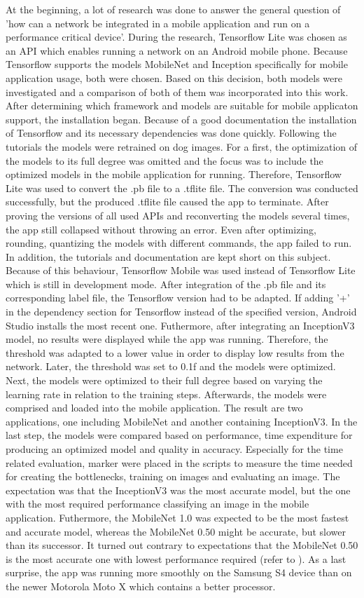 At the beginning, a lot of research was done to answer the general question of 'how can a network be integrated in a mobile application and run on a performance critical device'. During the research, Tensorflow Lite was chosen as an API which enables running a network on an Android mobile phone. Because Tensorflow supports the models MobileNet and Inception specifically for mobile application usage, both were chosen. Based on this decision, both models were investigated and a comparison of both of them was incorporated into this work. After determining which framework and models are suitable for mobile applicaton support, the installation began. Because of a good documentation the installation of Tensorflow and its necessary dependencies was done quickly. Following the tutorials the models were retrained on dog images. For a first, the optimization of the models to its full degree was omitted and the focus was to include the optimized models in the mobile application for running. Therefore, Tensorflow Lite was used to convert the .pb file to a .tflite file. The conversion was conducted successfully, but the produced .tflite file caused the app to terminate. After proving the versions of all used APIs and reconverting the models several times, the app still collapsed without throwing an error. Even after optimizing, rounding, quantizing the models with different commands, the app failed to run. In addition, the tutorials and documentation are kept short on this subject. Because of this behaviour, Tensorflow Mobile was used instead of Tensorflow Lite which is still in development mode. After integration of the .pb file and its corresponding label file, the Tensorflow version had to be adapted. If adding '+' in the dependency section for Tensorflow instead of the specified version, Android Studio installs the most recent one. Futhermore, after integrating an InceptionV3 model, no results were displayed while the app was running. Therefore, the threshold was adapted to a lower value in order to display low results from the network. Later, the threshold was set to 0.1f and the models were optimized. Next, the models were optimized to their full degree based on varying the learning rate in relation to the training steps. Afterwards, the models were comprised and loaded into the mobile application. The result are two applications, one including MobileNet and another containing InceptionV3. In the last step, the models were compared based on performance, time expenditure for producing an optimized model and quality in accuracy. Especially for the time related evaluation, marker were placed in the scripts to measure the time needed for creating the bottlenecks, training on images and evaluating an image. The expectation was that the InceptionV3 was the most accurate model, but the one with the most required performance classifying an image in the mobile application. Futhermore, the MobileNet 1.0 was expected to be the most fastest and accurate model, whereas the MobileNet 0.50 might be accurate, but slower than its successor. It turned out contrary to expectations that the MobileNet 0.50 is the most accurate one with lowest performance required (refer to ). As a last surprise, the app was running more smoothly on the Samsung S4 device than on the newer Motorola Moto X which contains a better processor.
